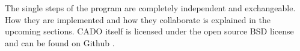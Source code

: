 The single steps of the program are completely independent and exchangeable. How they are implemented and how they collaborate is explained in the upcoming sections. CADO itself is licensed under the open source BSD license and can be found on Github \cite{CADOGit}.